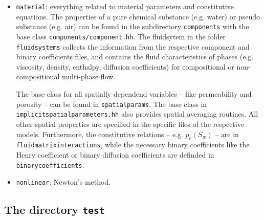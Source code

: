 \begin{itemize}
\item \texttt{material}: everything related to material parameters and 
constitutive equations. The properties of a pure chemical substance (e.g. water) or pseudo substance (e.g. air) can be found in the subdirectory \texttt{components} with the base class \texttt{components/component.hh}. The fluidsytem in the folder \texttt{fluidsystems} collects the information from the respective component and binary coefficients files, and contains the fluid characteristics of phases (e.g. viscosity, density, enthalpy, diffusion coefficients) for compositional or non-compositional multi-phase flow. 

The base class for all spatially dependend variables -- like permeability and porosity  -- 
can be found in \texttt{spatialparams}. The base class in \texttt{implicitspatialparameters.hh} 
also provides spatial averaging routines. All other spatial properties are specified in the specific
 files of the respective models. Furthermore, the constitutive relations -- e.g. $p_c(S_w) $ -- are in \texttt{fluidmatrixinteractions}, 
while the necessary binary coefficients like the Henry coefficient or binary diffusion coefficients are definded in
 \texttt{binarycoefficients}.


\item \texttt{nonlinear}: Newton's method.


% 
% 
% 
% 
% 
% 
% 
% 


\end{itemize}



\subsection{The directory \texttt{test}}\label{sec:test}


